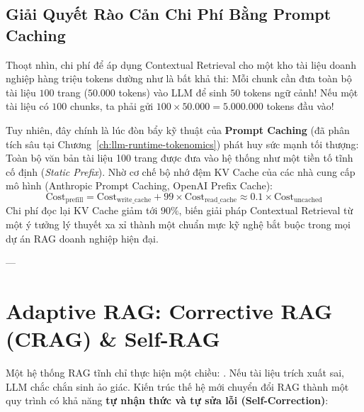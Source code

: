 \subsection{Giải Quyết Rào Cản Chi Phí Bằng Prompt Caching}
Thoạt nhìn, chi phí để áp dụng Contextual Retrieval cho một kho tài liệu doanh nghiệp hàng triệu tokens dường như là bất khả thi: Mỗi chunk cần đưa toàn bộ tài liệu $100$ trang ($50.000$ tokens) vào LLM để sinh $50$ tokens ngữ cảnh! Nếu một tài liệu có $100$ chunks, ta phải gửi $100 \times 50.000 = 5.000.000$ tokens đầu vào!

Tuy nhiên, đây chính là lúc đòn bẩy kỹ thuật của \textbf{Prompt Caching} (đã phân tích sâu tại Chương~\ref{ch:llm-runtime-tokenomics}) phát huy sức mạnh tối thượng:
Toàn bộ văn bản tài liệu 100 trang được đưa vào hệ thống như một tiền tố tĩnh cố định (\textit{Static Prefix}). Nhờ cơ chế bộ nhớ đệm KV Cache của các nhà cung cấp mô hình (Anthropic Prompt Caching, OpenAI Prefix Cache):
\begin{equation}
\text{Cost}_{\text{prefill}} = \text{Cost}_{\text{write\_cache}} + 99 \times \text{Cost}_{\text{read\_cache}} \approx 0.1 \times \text{Cost}_{\text{uncached}}
\end{equation}
Chi phí đọc lại KV Cache giảm tới $90\%$, biến giải pháp Contextual Retrieval từ một ý tưởng lý thuyết xa xỉ thành một chuẩn mực kỹ nghệ bắt buộc trong mọi dự án RAG doanh nghiệp hiện đại.

---

\section{Adaptive RAG: Corrective RAG (CRAG) \& Self-RAG}
\label{sec:adaptive-rag}

Một hệ thống RAG tĩnh chỉ thực hiện một chiều: . Nếu tài liệu trích xuất sai, LLM chắc chắn sinh ảo giác.
Kiến trúc thế hệ mới chuyển đổi RAG thành một quy trình có khả năng \textbf{tự nhận thức và tự sửa lỗi (Self-Correction)}:

